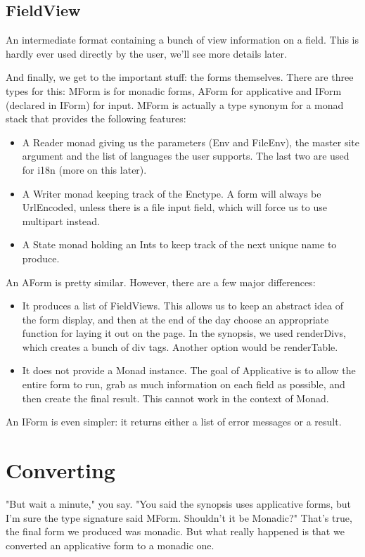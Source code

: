 \subsection{FieldView}

An intermediate format containing a bunch of view information on a field. This is hardly
ever used directly by the user, we'll see more details later.

And finally, we get to the important stuff: the forms themselves. There are three types
for this: MForm is for monadic forms, AForm for applicative and IForm (declared in IForm)
for input. MForm is actually a type synonym for a monad stack that provides the following
features:
\begin{itemize}
\item A Reader monad giving us the parameters (Env and FileEnv), the master site
argument and the list of languages the user supports. The last two are used for i18n (more
on this later).
\item A Writer monad keeping track of the Enctype. A form will always be UrlEncoded,
unless there is a file input field, which will force us to use multipart instead.
\item A State monad holding an Ints to keep track of the next unique name to produce.
\end{itemize}
An AForm is pretty similar. However, there are a few major differences:
\begin{itemize}
\item It produces a list of FieldViews. This allows us to keep an abstract idea of the
form display, and then at the end of the day choose an appropriate function for laying it
out on the page. In the synopsis, we used renderDivs, which creates a bunch of div tags.
Another option would be renderTable.

\item It does not provide a Monad instance. The goal of Applicative is to allow the entire
form to run, grab as much information on each field as possible, and then create the final
result. This cannot work in the context of Monad.
\end{itemize}
An IForm is even simpler: it returns either a list of error messages or a result.

\section{Converting}

"But wait a minute," you say. "You said the synopsis uses applicative forms, but I'm sure
the type signature said MForm. Shouldn't it be Monadic?" That's true, the final form we
produced was monadic. But what really happened is that we converted an applicative form to
a monadic one.

